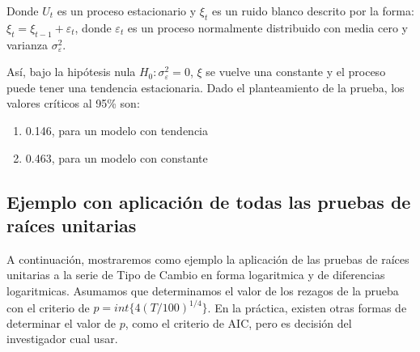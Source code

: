 \documentclass[
]{book}
\begin{document}
Donde \(U_t\) es un proceso estacionario y \(\xi_t\) es un ruido blanco descrito por la forma: \(\xi_t = \xi_{t-1} + \varepsilon_t\), donde \(\varepsilon_t\) es un proceso normalmente distribuido con media cero y varianza \(\sigma^2_\varepsilon\).

Así, bajo la hipótesis nula \(H_0 : \sigma^2_\varepsilon = 0\), \(\xi\) se vuelve una constante y el proceso puede tener una tendencia estacionaria. Dado el planteamiento de la prueba, los valores críticos al 95\% son:

\begin{enumerate}
\def\labelenumi{\arabic{enumi}.}
\item
  0.146, para un modelo con tendencia
\item
  0.463, para un modelo con constante
\end{enumerate}

\hypertarget{ejemplo-con-aplicaciuxf3n-de-todas-las-pruebas-de-rauxedces-unitarias}{%
\subsection{Ejemplo con aplicación de todas las pruebas de raíces unitarias}\label{ejemplo-con-aplicaciuxf3n-de-todas-las-pruebas-de-rauxedces-unitarias}}

A continuación, mostraremos como ejemplo la aplicación de las pruebas de raíces unitarias a la serie de Tipo de Cambio en forma logaritmica y de diferencias logaritmicas. Asumamos que determinamos el valor de los rezagos de la prueba con el criterio de \(p = int\{ 4 (T/100)^{1/4} \}\). En la práctica, existen otras formas de determinar el valor de \(p\), como el criterio de AIC, pero es decisión del investigador cual usar.
\end{document}
